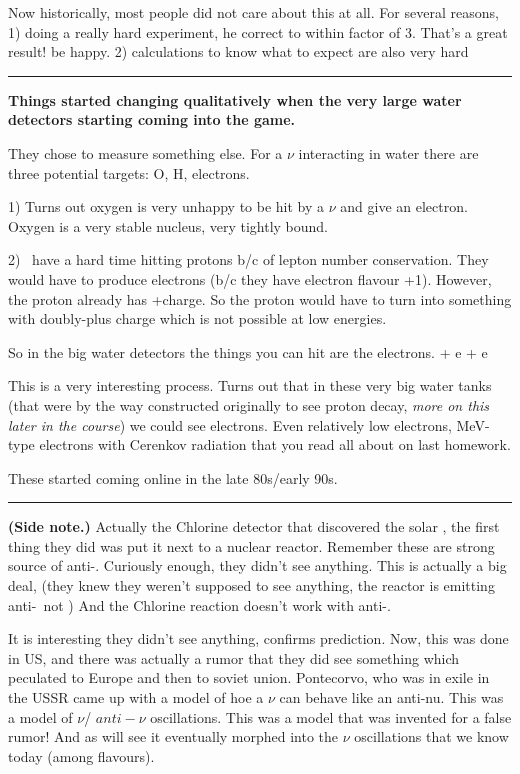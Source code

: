 {Now historically, most people did not care about this at all.
For several reasons, 
1) doing a really hard experiment, he correct to within factor of 3. That's a great result! be happy. 
2) calculations to know what to expect are also very hard 

\noindent\rule{\textwidth}{1pt}

\textbf{Things started changing qualitatively when the very large water detectors starting coming into the game. }

They chose to measure something else.
For a $\nu$ interacting in water there are three potential targets:  O, H, electrons.

1) Turns out oxygen is very unhappy to be hit by a $\nu$ and give an electron. 
Oxygen is a very stable nucleus, very tightly bound.

2) \nus\ have a hard time hitting protons b/c of lepton number conservation. 
They would have to produce electrons (b/c they have electron flavour +1). 
However, the proton already has +charge.  
So the proton would have to turn into something with doubly-plus charge which is not possible at low energies. 

So in the big water detectors the things you can hit are the electrons. 
\be
\nu + e \rightarrow \nu + e
\ee

This is a very interesting process.
Turns out that in these very big water tanks (that were by the way constructed originally to see proton decay, \textit{more on this later in the course}) we could see electrons.
Even relatively low electrons, MeV-type electrons with Cerenkov radiation that you read all about on last homework.

These started coming online in the late 80s/early 90s.

\noindent\rule{\textwidth}{1pt}

\textbf{(Side note.)}
Actually the Chlorine detector that discovered the solar \nus, the first thing they did was put it next to a nuclear reactor.
Remember these are strong source of anti-\nus.
Curiously enough, they didn't see anything.
This is actually a big deal, (they knew they weren't supposed to see anything, the reactor is emitting anti-\nus\ not \nus) 
And the Chlorine reaction doesn't work with anti-\nus. 

It is interesting they didn't see anything, confirms prediction. 
Now, this was done in US, and there was actually a rumor that they did see something which peculated to Europe and then to soviet union. 
Pontecorvo, who was in exile in the USSR came up with a model of hoe a $\nu$ can behave like an anti-nu.
This was a model of $\nu$/ $anti-\nu$ oscillations. 
This was a model that was invented for a false rumor! 
And as will see it eventually morphed into the $\nu$ oscillations that we know today (among flavours). 

}
